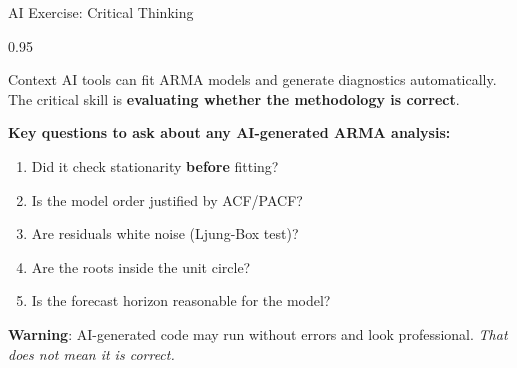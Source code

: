 \documentclass[9pt, aspectratio=169, t]{beamer}
\begin{document}
\begin{frame}{AI Exercise: Critical Thinking}
    \begin{cminipage}{0.95\textwidth}
    \vspace{-0.3cm}
    \begin{block}{\footnotesize Context}
        {\footnotesize
        AI tools can fit ARMA models and generate diagnostics automatically.
        The critical skill is \textbf{evaluating whether the methodology is correct}.
        }
    \end{block}
    \vspace{-2mm}
    {\footnotesize
    \textbf{Key questions to ask about any AI-generated ARMA analysis:}
    \begin{enumerate}\setlength{\itemsep}{0pt}
        \item Did it check stationarity \textbf{before} fitting?
        \item Is the model order justified by ACF/PACF?
        \item Are residuals white noise (Ljung-Box test)?
        \item Are the roots inside the unit circle?
        \item Is the forecast horizon reasonable for the model?
    \end{enumerate}
    }
    \vspace{-2mm}
    \begin{alertblock}{}
        {\footnotesize \textbf{Warning}: AI-generated code may run without errors and look professional. \textit{That does not mean it is correct.}}
    \end{alertblock}
    \end{cminipage}
\end{frame}
\end{document}
